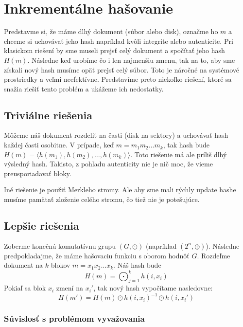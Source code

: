 \section{Inkrementálne hašovanie}

Predstavme si, že máme dlhý dokument (súbor alebo disk),
označme ho $m$ a chceme si uchovávať jeho hash napríklad kvôli
integrite alebo autenticite. Pri klasickom riešení
by sme museli prejsť celý dokument a spočítať jeho 
hash $H(m)$. Následne keď urobíme čo i len najmenšiu
zmenu, tak na to, aby sme získali nový hash musíme opäť
prejsť celý súbor. Toto je náročné na systémové prostriedky
a veľmi neefektívne. Predstavíme preto niekoľko riešení, ktoré sa
snažia riešiť tento problém a ukážeme ich nedostatky.

\subsection{Triviálne riešenia}

Môžeme náš dokument rozdeliť na časti (disk na sektory)
a uchovávať hash každej časti osobitne. V prípade, keď
$m = m_1 m_2 \dots m_k$, tak hash bude 
$H(m) = \langle h(m_1), h(m_2), \dots, h(m_k) \rangle$.
Toto riešenie má ale príliš dlhý výsledný hash.
Takisto, z pohľadu autenticity nie je nič moc, že vieme
preusporiadavať bloky.

Iné riešenie je použiť Merkleho stromy. Ale aby
sme mali rýchly update hashe musíme pamätať zloženie celého stromu,
čo tiež nie je potešujúce.


\subsection{Lepšie riešenia}

Zoberme konečnú komutatívnu grupu $(G, \odot)$ (napríklad $(2^n, \oplus)$).
Následne predpokladajme, že máme hašovaciu funkciu s oborom hodnôť $G$.
Rozdeľme dokument na $k$ blokov $m = x_1 x_2 \dots x_k$. Náš hash bude 
\begin{equation*}
    H(m) = \bigodot_{j=1}^k h(i, x_i)
\end{equation*}
Pokiaľ sa blok $x_i$ zmení na $x_i'$, tak nový hash vypočítame
nasledovne:
\begin{equation*}
    H(m') = H(m) \odot h(i, x_i)^{-1} \odot h(i, x_i')
\end{equation*}

\subsubsection{Súvislosť s problémom vyvažovania}

